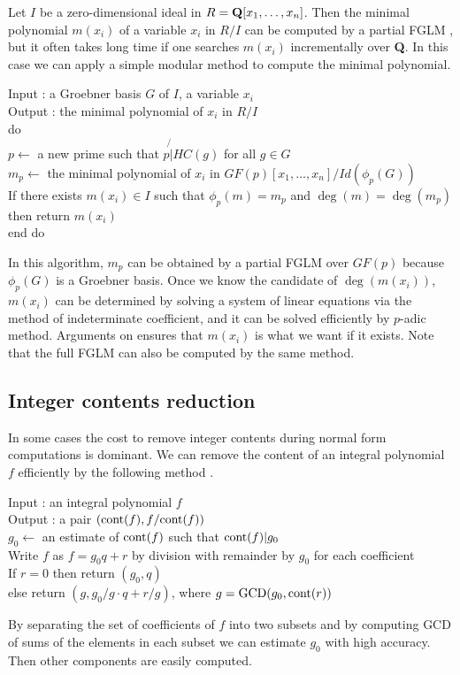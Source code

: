 \documentclass[runningheads]{cl2emult}
\def\cont{{\rm cont}}
\def\GCD{{\rm GCD}}
\begin{document}
Let $I$ be a zero-dimensional ideal in $R={\bf Q}[x_1,\ldots,x_n]$.
Then the minimal polynomial $m(x_i)$ of a variable $x_i$ in $R/I$ can
be computed by a partial FGLM \cite{noro:FGLM}, but it often takes long
time if one searches $m(x_i)$ incrementally over {\bf Q}.  In this
case we can apply a simple modular method to compute the minimal
polynomial.
\begin{tabbing}
Input : a Groebner basis $G$ of $I$, a variable $x_i$\\
Output : the minimal polynomial of $x_i$ in $R/I$\\
do \= \\
\> $p \leftarrow$ a new prime such that $p \not{|} HC(g)$ for all $g \in G$\\
\> $m_p \leftarrow$ the minimal polynomial of $x_i$ in $GF(p)[x_1,\ldots,x_n]/Id(\phi_p(G))$\\
\> If there exists $m(x_i) \in I$ such that $\phi_p(m) = m_p$ and $\deg(m)=\deg(m_p)$\\
\> then return $m(x_i)$\\
end do
\end{tabbing}
In this algorithm, $m_p$ can be obtained by a partial FGLM over
$GF(p)$ because $\phi_p(G)$ is a Groebner basis. Once we know the
candidate of $\deg(m(x_i))$, $m(x_i)$ can be determined by solving a
system of linear equations via the method of indeterminate
coefficient, and it can be solved efficiently by $p$-adic method.
Arguments on \cite{noro:NOYO} ensures that $m(x_i)$ is what we want if it
exists. Note that the full FGLM can also be computed by the same
method.

\subsection{Integer contents reduction}
\label{sec:gbcont}

In some cases the cost to remove integer contents during normal form
computations is dominant. We can remove the content of an integral
polynomial $f$ efficiently by the following method \cite{noro:REPL}.
\begin{tabbing}
Input : an integral polynomial $f$\\
Output : a pair $(\cont(f),f/\cont(f))$\\
$g_0 \leftarrow$ an estimate of $\cont(f)$ such that $\cont(f)|g_0$\\
Write $f$ as $f = g_0q+r$ by division with remainder by $g_0$ for each coefficient\\
If $r = 0$ then return $(g_0,q)$\\
else return $(g,g_0/g \cdot q + r/g)$, where $g = \GCD(g_0,\cont(r))$
\end{tabbing}
By separating the set of coefficients of $f$ into two subsets and by
computing GCD of sums of the elements in each subset we can estimate
$g_0$ with high accuracy. Then other components are easily computed.
\end{document}
